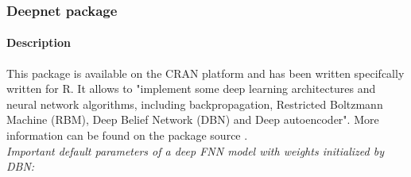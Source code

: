 \documentclass[letter,8pt]{article}\usepackage[]{graphicx}\usepackage[]{color}
\begin{document}
\subsubsection{Deepnet package}
\paragraph{Description}
This package is available on the CRAN platform and has been written specifcally written for R. It allows to "implement some deep learning architectures and neural network algorithms, including backpropagation, Restricted Boltzmann Machine (RBM), Deep Belief Network (DBN) and Deep autoencoder". More information can be found on the package source \cite{deepnet2015}.\\
\textit{Important default parameters of a deep FNN model with weights initialized by DBN:}
\end{document}
